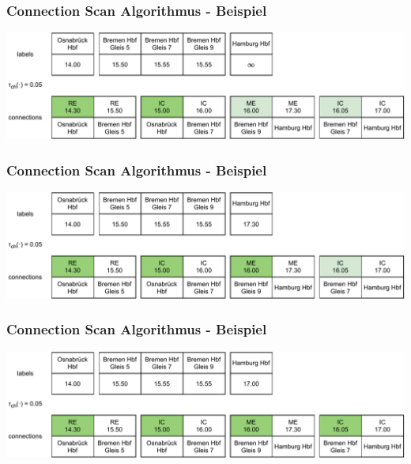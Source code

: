 \documentclass[aspectratio=169]{beamer}
\begin{document}

\begin{frame}
\frametitle{Connection Scan Algorithmus - Beispiel}
\centering
\includegraphics[scale=.7]{csa1.pdf}
\end{frame}


\begin{frame}
\frametitle{Connection Scan Algorithmus - Beispiel}
\centering
\includegraphics[scale=.7]{csa2.pdf}
\end{frame}


\begin{frame}
\frametitle{Connection Scan Algorithmus - Beispiel}
\centering
\includegraphics[scale=.7]{csa3.pdf}
\end{frame}
\end{document}
